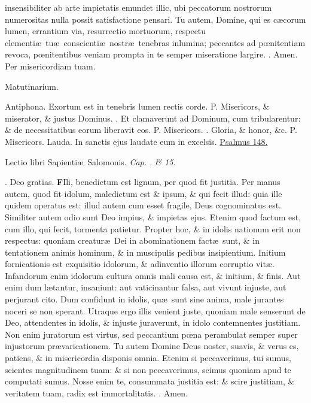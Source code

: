 \documentclass[letter,11pt]{book}
\makeatletter
\DeclareRobustCommand{\Vbar}{\vers@resp{-0.1em}{V}}
\DeclareRobustCommand{\Rbar}{\vers@resp{0pt}{R}}
\newcommand{\vers@resp@sym}{\raisebox{0.2ex}{\rotatebox[origin=c]{-20}{$\m@th\rceil$}}}
\newcommand{\vers@resp}[2]{%
  {\ooalign{\hidewidth\kern#1\vers@resp@sym\hidewidth\cr#2\cr}}%
}%
\def\P{\color{Red} P. \color{black}}
\def\V{\color{Red} \Vbar . \color{black}}
\def\R{\color{Red} \Rbar . \color{black}}
\makeatother
\begin{document}
\begin{multicols*}{2}
insensibiliter ab arte impietatis emundet illic, ubi peccatorum nostrorum numerositas nulla possit satisfactione pensari. Tu autem, Domine, qui es c\ae corum lumen, errantium via, resurrectio mortuorum, respectu clementi\ae \ tu\ae \ conscienti\ae \ nostr\ae \ tenebras inlumina; peccantes ad p\oe nitentiam revoca, p\oe nitentibus veniam prompta in te semper miseratione largire. \R Amen. Per misericordiam tuam.
\vspace{-.5em} \begin{center} \color{Red} Matutinarium. \color{black} \end{center} \vspace{-.5em}
\par \noindent \color{Red} Antiphona. \color{black} Exortum est in tenebris lumen rectis corde. \P Misericors, \& miserator, \& justus Dominus. \V Et clamaverunt ad Dominum, cum tribularentur: \& de necessitatibus eorum liberavit eos. \P Misericors. \V Gloria, \& honor, \&c. \P Misericors.
\newline \color{Red} Lauda. \color{black} In sanctis ejus laudate eum in excelsis. \color{Red} \hyperlink{ps148}{Psalmus 148.} \color{black}
\vspace{-.5em} \begin{center} {\color{Red} L}ectio libri Sapienti\ae \ Salomonis. \itshape Cap. . {\itshape \&} 15. \color{black} \end{center} \vspace{-.5em}
\par \noindent \R Deo gratias.
\lettrine[lines=2]{\bfseries \color{Red} F}{}Ili, benedictum est lignum, per quod fit justitia. Per manus autem, quod fit idolum, maledictum est \& ipsum, \& qui fecit illud: quia ille quidem operatus est: illud autem cum esset fragile, Deus cognominatus est. Similiter autem odio sunt Deo impius, \& impietas ejus. Etenim quod factum est, cum illo, qui fecit, tormenta patietur. Propter hoc, \& in idolis nationum erit non respectus: quoniam creatur\ae \ Dei in abominationem fact\ae \ sunt, \& in tentationem animis hominum, \& in muscipulis pedibus insipientium. Initium fornicationis est exquisitio idolorum, \& adinventio illorum corruptio vit\ae . Infandorum enim idolorum cultura omnis mali causa est, \& initium, \& finis. Aut enim dum l\ae tantur, insaniunt: aut vaticinantur falsa, aut vivunt injuste, aut perjurant cito. Dum confidunt in idolis, qu\ae \ sunt sine anima, male jurantes noceri se non sperant. Utraque ergo illis venient juste, quoniam male senserunt de Deo, attendentes in idolis, \& injuste juraverunt, in idolo contemnentes justitiam. Non enim juratorum est virtus, sed peccantium p\oe na perambulat semper super injustorum pr\ae varicationem. Tu autem Domine Deus noster, suavis, \& verus es, patiens, \& in misericordia disponis omnia. Etenim si peccaverimus, tui sumus, scientes magnitudinem tuam: \& si non peccaverimus, scimus quoniam apud te computati sumus. Nosse enim te, consummata justitia est: \& scire justitiam, \& veritatem tuam, radix est immortalitatis. \R Amen.

\end{multicols*}
\end{document}
